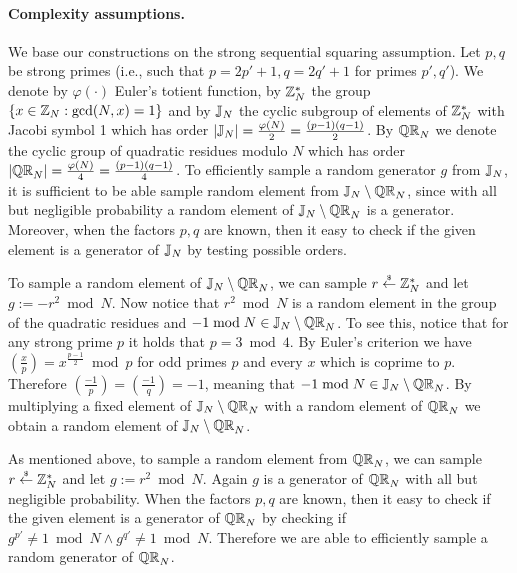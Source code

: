 \paragraph{Complexity assumptions.}
We base our constructions on the strong sequential squaring assumption. Let $p, q$ be strong primes (i.e., such that $p = 2p'+1,  q= 2q'+1$ for primes $p', q'$). We denote by $\varphi(\cdot)$ Euler's totient function, by $\mathbb{Z}_N^*$ the group $\{x \in \mathbb{Z}_N: \gcd(N,x) = 1\}$ and by $\mathbb{J}_N$ the cyclic subgroup of elements of $\mathbb{Z}_N^*$ with Jacobi symbol 1 which has order $|\mathbb{J}_N| = \frac{\varphi(N)}{2} = \frac{(p-1)(q-1)}{2}$. By $\mathbb{QR}_N$ we denote the cyclic group of quadratic residues modulo $N$ which has order $|\mathbb{QR}_N| = \frac{\varphi(N)}{4} = \frac{(p-1)(q-1)}{4}$. To efficiently sample a random generator $g$ from $\mathbb{J}_N$, it is sufficient to be able sample random element from $\mathbb{J}_N \setminus \mathbb{QR}_N$, since with all but negligible probability a random element of $\mathbb{J}_N \setminus \mathbb{QR}_N$ is a generator. Moreover, when the factors $p,q$ are known, then it easy to check if the given element is a generator of $\mathbb{J}_N$ by testing possible orders. 

To sample a random element of $\mathbb{J}_N \setminus \mathbb{QR}_N$, we can sample $r \stackrel{{\scriptscriptstyle\$}}{\leftarrow} \mathbb{Z}_N^*$ and let $g:= -r^2 \bmod N$. Now notice that $r^2 \bmod N$ is a random element in the group of the quadratic residues and $-1 \bmod N \in \mathbb{J}_N \setminus \mathbb{QR}_N$. To see this, notice that for any strong prime $p$ it holds that $p = 3 \bmod 4$. By Euler's criterion we have $\left( \frac{x}{p} \right)= x^{\frac{p-1}{2}} \bmod p$ for odd primes $p$ and every $x$ which is coprime to $p$.  Therefore $\left( \frac{-1}{p} \right)= \left( \frac{-1}{q} \right) = -1$, meaning that $-1 \bmod N \in \mathbb{J}_N \setminus \mathbb{QR}_N$. By multiplying a fixed element of $\mathbb{J}_N \setminus \mathbb{QR}_N$ with a random element of $\mathbb{QR}_N$ we obtain a random element of $\mathbb{J}_N \setminus \mathbb{QR}_N$. %

As mentioned above, to sample a random element from $\mathbb{QR}_N$, we can sample $r \stackrel{{\scriptscriptstyle\$}}{\leftarrow} \mathbb{Z}_N^*$ and let $g:= r^2 \bmod N$. Again $g$ is a generator of $\mathbb{QR}_N$ with all but negligible probability. When the factors $p,q$ are known, then it easy to check if the given element is a generator of $\mathbb{QR}_N$ by checking if $g^{p'} \neq 1 \bmod N \land g^{q'} \neq 1 \bmod N$. Therefore we are able to efficiently sample a random generator of $\mathbb{QR}_N$. %

